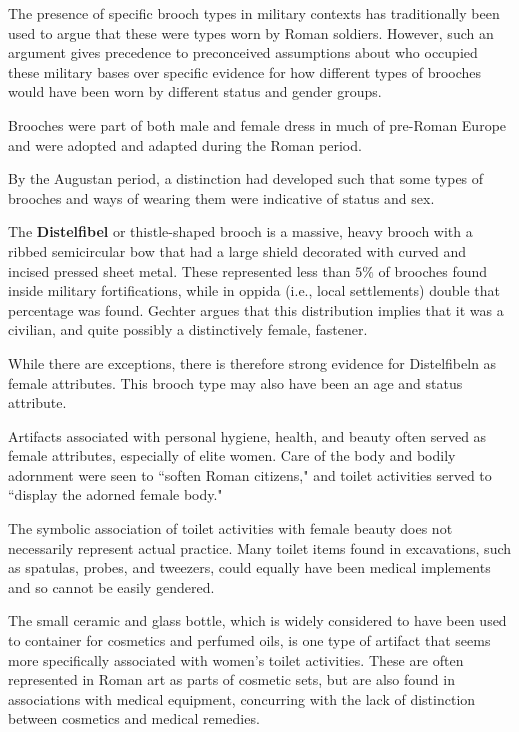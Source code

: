 The presence of specific brooch types in military contexts has traditionally been used to argue that these were types worn by Roman soldiers. However, such an argument gives precedence to preconceived assumptions about who occupied these military bases over specific evidence for how different types of brooches would have been worn by different status and gender groups.

\begin{rmk}
    Brooches were part of both male and female dress in much of pre-Roman Europe and were adopted and adapted during the Roman period.
\end{rmk}


By the Augustan period, a distinction had developed such that some types of brooches and ways of wearing them were indicative of status and sex.

The \textbf{Distelfibel} or thistle-shaped brooch is a massive, heavy brooch with a ribbed semicircular bow that had a large shield decorated with curved and incised pressed sheet metal. These represented less than $5\%$ of brooches found inside military fortifications, while in oppida (i.e., local settlements) double that percentage was found. Gechter argues that this distribution implies that it was a civilian, and quite possibly a distinctively female, fastener.

While there are exceptions, there is therefore strong evidence for Distelfibeln as female attributes. This brooch type may also have been an age and status attribute.


Artifacts associated with personal hygiene, health, and beauty often served as female attributes, especially of elite women. Care of the body and bodily adornment were seen to ``soften Roman citizens," and toilet activities served to ``display the adorned female body."

\begin{nte}
    The symbolic association of toilet activities with female beauty does not necessarily represent actual practice. Many toilet items found in excavations, such as spatulas, probes, and tweezers, could equally have been medical implements and so cannot be easily gendered.
\end{nte}

The small ceramic and glass bottle, which is widely considered to have been used to container for cosmetics and perfumed oils, is one type of artifact that seems more specifically associated with women's toilet activities. These are often represented in Roman art as parts of cosmetic sets, but are also found in associations with medical equipment, concurring with the lack of distinction between cosmetics and medical remedies.


